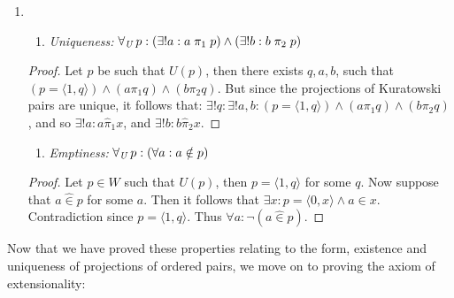\documentclass[11pt]{report}
\newcommand{\all}[1]{\forall_{\mathit{#1}}\hspace{0.5mm}}
\newcommand{\pleft}{\mathrel{\pi_1}}
\newcommand{\pright}{\mathrel{\pi_2}}
\newcommand{\pair}[2]{\langle #1,#2 \rangle}
\newcommand{\zin}{\mathrel{\widehat{\in}}}
\newcommand{\zpright}{\mathrel{\widehat{\pi}_2}}
\newcommand{\zpleft}{\mathrel{\widehat{\pi}_1}}
\theoremstyle{definition}
\theoremstyle{theorem}
\theoremstyle{lemma}
\begin{document}
\begin{enumerate}[series=axiomlist, label=\Roman*.]
\item \hspace{1mm}
  \begin{enumerate}[resume=sublist, label=(\roman*)]
  \item \textit{Uniqueness:} $\all{U} p: (\exists! a: a\pleft p) \wedge (\exists! b: b\pright p)$
  \end{enumerate}
    \begin{proof}
      Let $p$ be such that $U(p)$, then there exists $q,a,b$, such that $(p = \pair{1}{q}) \wedge (a\pleft q) \wedge (b\pright q)$.
      But since the projections of Kuratowski pairs are unique, it follows that:
      $\exists! q: \exists! a, b:(p=\pair{1}{q})\wedge (a\pleft q) \wedge (b\pright q)$, and so $\exists! a: a\zpleft x$, and $\exists! b: b\zpright x$.
    \end{proof}
  \begin{enumerate}[resume=sublist, label=(\roman*)]
    \item \textit{Emptiness:} $\all{U} p:(\forall a: a\notin p)$
  \end{enumerate}
  \begin{proof}
    Let $p\in W$ such that $U(p)$, then $p = \pair{1}{q}$ for some $q$. Now suppose that $a\zin p$ for some $a$.
    Then it follows that $\exists x: p = \pair{0}{x} \wedge a\in x$.
    Contradiction since $p = \pair{1}{q}$. Thus $\forall a: \neg(a\zin p)$.
  \end{proof}
\end{enumerate}
Now that we have proved these properties relating to the form, existence and uniqueness of projections of ordered pairs, we move on to proving the axiom of extensionality:
\end{document}
